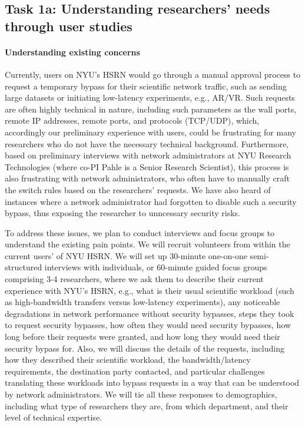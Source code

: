 \subsection{Task 1a: Understanding researchers' needs through user studies}

\paragraph{Understanding existing concerns}
Currently, users on NYU's HSRN would go through a manual approval process to request a temporary bypass for their scientific network traffic, such as sending large datasets or initiating low-latency experiments, e.g., AR/VR. Such requests are often highly technical in nature, including such parameters as the wall ports, remote IP addresses, remote ports, and protocols (TCP/UDP), which, accordingly our preliminary experience with users, could be frustrating for many researchers who do not have the necessary technical background. Furthermore, based on preliminary interviews with network administrators at NYU Research Technologies (where co-PI Pahle is a Senior Research Scientist), this process is also frustrating with network administrators, who often have to manually craft the switch rules based on the researchers' requests. We have also heard of instances where a network administrator had forgotten to disable such a security bypass, thus exposing the researcher to unncessary security risks.

To address these issues, we plan to conduct interviews and focus groups to understand the existing pain points. We will recruit volunteers from within the current users' of NYU HSRN. We will set up 30-minute one-on-one semi-structured interviews with individuals, or 60-minute guided focus groups comprising 3-4 researchers, where we ask them to describe their current experience with NYU's HSRN, e.g., what is their usual scientific workload (such as high-bandwidth transfers versus low-latency experiments), any noticeable degradations in network performance without security bypasses, steps they took to request security bypasses, how often they would need security bypasses, how long before their requests were granted, and how long they would need their security bypass for. Also, we will discuss the details of the requests, including how they described their scientific workload, the bandwidth/latency requirements, the destination party contacted, and particular challenges translating these workloads into bypass requests in a way that can be understood by network administrators. We will tie all these responses to demographics, including what type of researchers they are, from which department, and their level of technical expertise.

